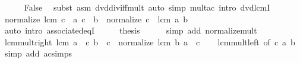 \begin{isabellebody}
\ \ \ \ \isamarkupfalse%
\ False\ \isamarkupfalse%
\ {\isacharparenleft}{\kern0pt}subst\ {\isacharparenleft}{\kern0pt}asm{\isacharparenright}{\kern0pt}\ dvd{\isacharunderscore}{\kern0pt}div{\isacharunderscore}{\kern0pt}iff{\isacharunderscore}{\kern0pt}mult{\isacharparenright}{\kern0pt}\ {\isacharparenleft}{\kern0pt}auto\ simp{\isacharcolon}{\kern0pt}\ mult{\isacharunderscore}{\kern0pt}ac\ intro{\isacharcolon}{\kern0pt}\ dvd{\isacharunderscore}{\kern0pt}lcmI{}{\isacharparenright}{\kern0pt}\isanewline
\ \ \isamarkupfalse%
\ \isamarkupfalse%
\ {\isachardoublequoteopen}normalize\ {\isacharparenleft}{\kern0pt}lcm\ {\isacharparenleft}{\kern0pt}c\ {\isacharasterisk}{\kern0pt}\ a{\isacharparenright}{\kern0pt}\ {\isacharparenleft}{\kern0pt}c\ {\isacharasterisk}{\kern0pt}\ b{\isacharparenright}{\kern0pt}{\isacharparenright}{\kern0pt}\ {\isacharequal}{\kern0pt}\ normalize\ {\isacharparenleft}{\kern0pt}c\ {\isacharasterisk}{\kern0pt}\ lcm\ a\ b{\isacharparenright}{\kern0pt}{\isachardoublequoteclose}\isanewline
\ \ \ \ \isamarkupfalse%
\ {\isacharparenleft}{\kern0pt}auto\ intro{\isacharcolon}{\kern0pt}\ associated{\isacharunderscore}{\kern0pt}eqI{\isacharparenright}{\kern0pt}\isanewline
\ \ \isamarkupfalse%
\ \isamarkupfalse%
\ {\isacharquery}{\kern0pt}thesis\isanewline
\ \ \ \ \isamarkupfalse%
\ {\isacharparenleft}{\kern0pt}simp\ add{\isacharcolon}{\kern0pt}\ normalize{\isacharunderscore}{\kern0pt}mult{\isacharparenright}{\kern0pt}\isanewline
{}\isamarkupfalse%
%
\endisatagproof
{\isafoldproof}%
%
\isadelimproof
\isanewline
%
\endisadelimproof
\isanewline
{}\isamarkupfalse%
\ lcm{\isacharunderscore}{\kern0pt}mult{\isacharunderscore}{\kern0pt}right{\isacharcolon}{\kern0pt}\ {\isachardoublequoteopen}lcm\ {\isacharparenleft}{\kern0pt}a\ {\isacharasterisk}{\kern0pt}\ c{\isacharparenright}{\kern0pt}\ {\isacharparenleft}{\kern0pt}b\ {\isacharasterisk}{\kern0pt}\ c{\isacharparenright}{\kern0pt}\ {\isacharequal}{\kern0pt}\ normalize\ {\isacharparenleft}{\kern0pt}lcm\ b\ a\ {\isacharasterisk}{\kern0pt}\ c{\isacharparenright}{\kern0pt}{\isachardoublequoteclose}\isanewline
%
\isadelimproof
\ \ %
\endisadelimproof
%
\isatagproof
{}\isamarkupfalse%
\ lcm{\isacharunderscore}{\kern0pt}mult{\isacharunderscore}{\kern0pt}left\ {\isacharbrackleft}{\kern0pt}of\ c\ a\ b{\isacharbrackright}{\kern0pt}\ \isamarkupfalse%
\ {\isacharparenleft}{\kern0pt}simp\ add{\isacharcolon}{\kern0pt}\ ac{\isacharunderscore}{\kern0pt}simps{\isacharparenright}{\kern0pt}%

\end{isabellebody}
